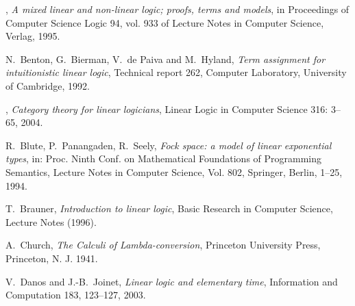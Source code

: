 \documentclass[english,letter paper,12pt,reqno]{article}
\theoremstyle{example}
\numberwithin{equation}{section}
\begin{document}
\begin{thebibliography}{BHLS03}
\bysame, \textsl{A mixed linear and non-linear logic; proofs, terms and models}, in Proceedings of Computer Science Logic 94, vol. 933 of Lecture Notes in Computer Science, Verlag, 1995.

N.~Benton, G.~Bierman, V.~de Paiva and M.~Hyland, \textsl{Term assignment for intuitionistic linear logic}, Technical report 262, Computer Laboratory, University of Cambridge, 1992.




\bysame, \textsl{Category theory for linear logicians}, Linear Logic in Computer Science 316: 3--65, 2004.

R.~Blute, P.~Panangaden, R.~Seely, \textsl{Fock space: a model of linear exponential types}, in: Proc. Ninth Conf. on Mathematical Foundations of Programming Semantics, Lecture Notes in Computer Science, Vol. 802, Springer, Berlin, 1--25, 1994.

T.~Brauner, \textsl{Introduction to linear logic}, Basic Research in Computer Science, Lecture Notes (1996).

A.~Church, \textsl{The {C}alculi of {L}ambda-conversion}, Princeton University Press, Princeton, N. J. 1941.

V.~Danos and J.-B.~Joinet, \textsl{Linear logic and elementary time}, Information and Computation 183, 123--127, 2003.





\end{thebibliography}
\end{document}
